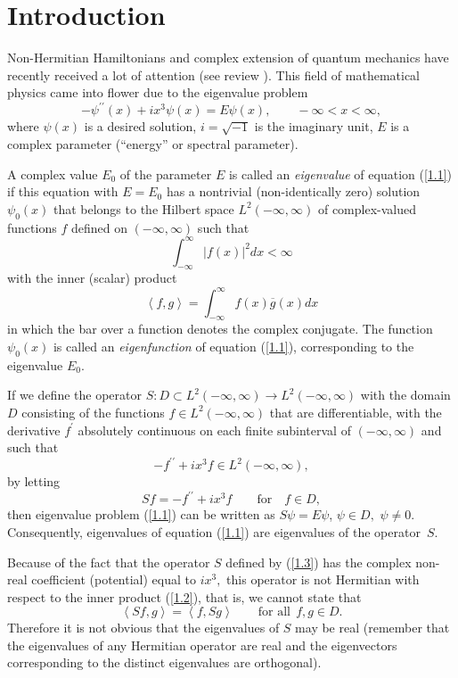 \section{Introduction}\label{section1}

Non-Hermitian Hamiltonians and complex extension of quantum mechanics have
recently received a lot of attention (see review \cite{[1]}). This f\/ield of
mathematical physics came into f\/lower due to the eigenvalue problem%
\begin{equation}
-\psi ^{\prime \prime }(x)+ix^{3}\psi (x)=E\psi (x),\qquad -\infty
<x<\infty ,  \label{1.1}
\end{equation}%
where $\psi (x)$ is a desired solution, $i=\sqrt{-1}$ is the imaginary unit,
$E$ is a complex parameter (``energy'' or spectral parameter).

A complex value $E_{0}$ of the parameter $E$ is called an \textit{eigenvalue}
of equation (\ref{1.1}) if this equation with $E=E_{0}$ has a nontrivial
(non-identically zero) solution $\psi _{0}(x)$ that belongs to the Hilbert
space $L^{2}(-\infty ,\infty )$ of complex-valued functions $f$ def\/ined on $%
(-\infty ,\infty )$ such that%
\[
\int_{-\infty }^{\infty }\left\vert f(x)\right\vert ^{2}dx<\infty
\]%
with the inner (scalar) product%
\begin{equation}
\left\langle f,g\right\rangle =\int_{-\infty }^{\infty }f(x)\overline{g}(x)dx
\label{1.2}
\end{equation}%
in which the bar over a function denotes the complex conjugate. The function
$\psi _{0}(x)$ is called an \textit{eigenfunction} of equation (\ref{1.1}),
corresponding to the eigenvalue $E_{0}.$

If we def\/ine the operator $S:D\subset L^{2}(-\infty ,\infty )\rightarrow
L^{2}(-\infty ,\infty )$ with the domain $D$ consisting of the functions $%
f\in L^{2}(-\infty ,\infty )$ that are dif\/ferentiable, with the derivative $%
f^{\prime }$ absolutely continuous on each f\/inite subinterval of $(-\infty
,\infty )$ and such that%
\[
-f^{\prime \prime }+ix^{3}f\in L^{2}(-\infty ,\infty ),
\]%
by letting%
\begin{equation}
Sf=-f^{\prime \prime }+ix^{3}f\qquad \text{for} \quad f\in D,  \label{1.3}
\end{equation}%
then eigenvalue problem (\ref{1.1}) can be written as $S\psi =E\psi $, $\psi
\in D,$ $\psi \neq 0.$ Consequently, eigenvalues of equation (\ref{1.1}) are
eigenvalues of the operator~$S$.

Because of the fact that the operator $S$ def\/ined by (\ref{1.3}) has the
complex non-real coef\/f\/icient (potential) equal to $ix^{3},$ this operator is
not Hermitian with respect to the inner product (\ref{1.2}), that is, we
cannot state that%
\[
\left\langle Sf,g\right\rangle =\left\langle f,Sg\right\rangle \qquad \text{for all} \ \ f,g\in D.
\]%
Therefore it is not obvious that the eigenvalues of $S$ may be real
(remember that the eigenvalues of any Hermitian operator are real and the
eigenvectors corresponding to the distinct eigenvalues are orthogonal).

